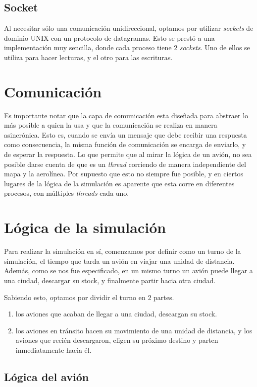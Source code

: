\documentclass[a4paper,10pt]{article}
\begin{document}
\subsection{Socket}
Al necesitar sólo una comunicación unidireccional, optamos por utilizar \textit{sockets} de dominio UNIX con un protocolo de datagramas.
Esto se prestó a una implementación muy sencilla, donde cada proceso tiene 2 \textit{sockets}.
Uno de ellos se utiliza para hacer lecturas, y el otro para las escrituras.

\newpage
\section{Comunicación}
Es importante notar que la capa de comunicación esta diseñada para abstraer lo más posible a quien la usa y que la comunicación se realiza en manera asincrónica.
Esto es, cuando se envía un mensaje que debe recibir una respuesta como consecuencia, la misma función de comunicación se encarga de enviarlo, y de esperar 
la respuesta. Lo que permite que al mirar la lógica de un avión, no sea posible darse cuenta de que es un \textit{thread} corriendo de manera independiente del mapa y
 la aerolínea. Por supuesto que esto no siempre fue posible, y en ciertos lugares de la lógica de la simulación es aparente que esta corre en diferentes procesos,
 con múltiples \textit{threads} cada uno.

\newpage
\section{Lógica de la simulación}
Para realizar la simulación en sí, comenzamos por definir como un turno de la simulación, el tiempo que tarda un avión en viajar una unidad de distancia.
Además, como se nos fue especificado, en un mismo turno un avión puede llegar a una ciudad, descargar su stock, y finalmente partir hacia otra ciudad.

Sabiendo esto, optamos por dividir el turno en 2 partes.
\begin{enumerate}
  \item los aviones que acaban de llegar a una ciudad, descargan su stock.
  \item los aviones en tránsito hacen su movimiento de una unidad de distancia, y los aviones que recién descargaron, eligen su próximo destino y 
	parten inmediatamente hacia él.
\end{enumerate}


\subsection{Lógica del avión}
\end{document}
